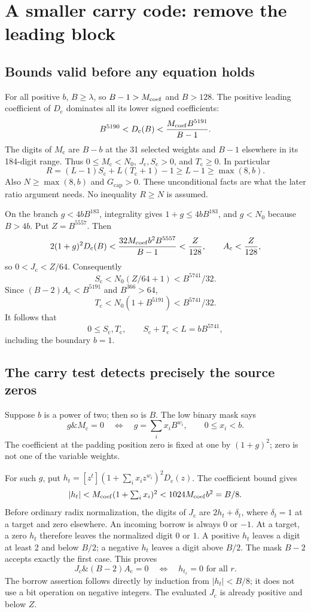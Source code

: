 \documentclass[11pt]{article}
\newcommand{\Gcap}{G_{\mathrm{cap}}}
\newcommand{\Sc}{S_{\mathrm c}}
\newcommand{\Tc}{T_{\mathrm c}}
\newcommand{\Jc}{J_{\mathrm c}}
\newcommand{\Mc}{M_{\mathrm c}}
\newcommand{\Dc}{D_{\mathrm c}}
\newcommand{\Ac}{A_{\mathrm c}}
\theoremstyle{remark}\newtheorem{remark}[theorem]{Remark}
\begin{document}
\section{A smaller carry code: remove the leading block}\label{sec:carry}

\subsection{Bounds valid before any equation holds}

For all positive $b$, $B\geq\lambda$, so $B-1>M_{\rm coef}$ and $B>128$.
The positive leading coefficient of $\Dc$ dominates all its lower signed
coefficients:
\[
 B^{5190}<\Dc(B)<\frac{M_{\rm coef}B^{5191}}{B-1}.
\]
The digits of $\Mc$ are $B-b$ at the 31 selected weights and $B-1$
elsewhere in its 184-digit range. Thus $0\leq\Mc<N_0$,
$\Jc,\Sc>0$, and $\Tc\geq0$. In particular
\begin{equation}\label{eq:Rpositive}
 R=(L-1)\Sc+L(\Tc+1)-1\geq L-1\geq\max(8,b).
\end{equation}
Also $N\geq\max(8,b)$ and $\Gcap>0$. These unconditional facts are what
the later ratio argument needs. No inequality $R\geq N$ is assumed.

On the branch $g<4bB^{183}$, integrality gives $1+g\leq4bB^{183}$,
and $g<N_0$ because $B>4b$. Put $Z=B^{5557}$. Then
\[
 2(1+g)^2\Dc(B)
 <\frac{32M_{\rm coef}b^2 B^{5557}}{B-1}<\frac Z{128},
 \qquad \Ac<\frac Z{128},
\]
so $0<\Jc<Z/64$. Consequently
\[
 \Sc<N_0(Z/64+1)<B^{5741}/32.
\]
Since $(B-2)\Ac<B^{5191}$ and $B^{366}>64$,
\[
 \Tc<N_0(1+B^{5191})<B^{5741}/32.
\]
It follows that
\begin{equation}\label{eq:blockbound}
 0\leq\Sc,\Tc,\qquad\Sc+\Tc<L=bB^{5741},
\end{equation}
including the boundary $b=1$.

\subsection{The carry test detects precisely the source zeros}

Suppose $b$ is a power of two; then so is $B$. The low binary mask says
\[
 g\mathbin{\&}\Mc=0
 \quad\Longleftrightarrow\quad
 g=\sum_i x_iB^{w_i},\qquad0\leq x_i<b.
\]
The coefficient at the padding position zero is fixed at one by
$(1+g)^2$; zero is not one of the variable weights.

For such $g$, put
$h_t=[z^t](1+\sum_i x_i z^{w_i})^2\Dc(z)$. The coefficient bound gives
\[
 |h_t|<M_{\rm coef}(1+\textstyle\sum_i x_i)^2
          <1024M_{\rm coef}b^2=B/8.
\]
Before ordinary radix normalization, the digits of $\Jc$ are
$2h_t+\delta_t$, where $\delta_t=1$ at a target and zero elsewhere.
An incoming borrow is always $0$ or $-1$. At a target, a zero $h_t$
therefore leaves the normalized digit $0$ or $1$. A positive $h_t$ leaves
a digit at least 2 and below $B/2$; a negative $h_t$ leaves a digit above
$B/2$. The mask $B-2$ accepts exactly the first case. This proves
\[
 \Jc\mathbin{\&}(B-2)\Ac=0
 \quad\Longleftrightarrow\quad h_{t_r}=0\text{ for all }r.
\]
The borrow assertion follows directly by induction from
$|h_t|<B/8$; it does not use a bit operation on negative integers.
The evaluated $\Jc$ is already positive and below $Z$.
\end{document}
